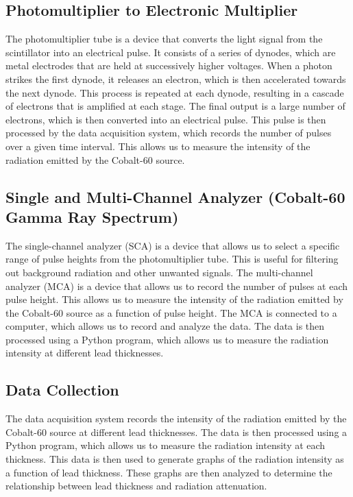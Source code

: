 \documentclass[12pt]{article}
\begin{document}
    \subsection{Photomultiplier to Electronic Multiplier}
        The photomultiplier tube is a device that converts the light signal from the scintillator into an electrical pulse. 
        It consists of a series of dynodes, which are metal electrodes that are held at successively higher voltages. 
        When a photon strikes the first dynode, it releases an electron, which is then accelerated towards the next dynode. 
        This process is repeated at each dynode, resulting in a cascade of electrons that is amplified at each stage. 
        The final output is a large number of electrons, which is then converted into an electrical pulse. 
        This pulse is then processed by the data acquisition system, which records the number of pulses over a given time interval. 
        This allows us to measure the intensity of the radiation emitted by the Cobalt-60 source.
        
    \subsection{Single and Multi-Channel Analyzer (Cobalt-60 Gamma Ray Spectrum)}
        The single-channel analyzer (SCA) is a device that allows us to select a specific range of pulse heights from the photomultiplier tube. 
        This is useful for filtering out background radiation and other unwanted signals. 
        The multi-channel analyzer (MCA) is a device that allows us to record the number of pulses at each pulse height. 
        This allows us to measure the intensity of the radiation emitted by the Cobalt-60 source as a function of pulse height. 
        The MCA is connected to a computer, which allows us to record and analyze the data. 
        The data is then processed using a Python program, which allows us to measure the radiation intensity at different lead thicknesses.
        
    \subsection{Data Collection}
        The data acquisition system records the intensity of the radiation emitted by the Cobalt-60 source at different lead thicknesses. 
        The data is then processed using a Python program, which allows us to measure the radiation intensity at each thickness. 
        This data is then used to generate graphs of the radiation intensity as a function of lead thickness. 
        These graphs are then analyzed to determine the relationship between lead thickness and radiation attenuation.
        
\end{document}
